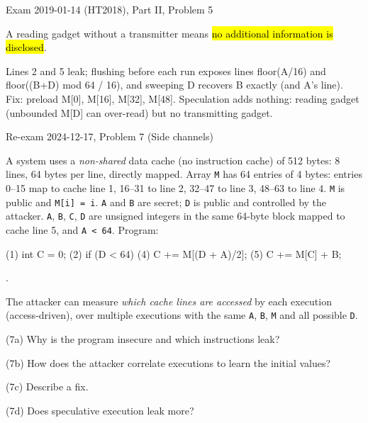 \documentclass[12pt, a4paper]{article}
\newcommand{\imp}[1]{\hl{#1}}                       %
\begin{document}
\begin{practicebox}{Exam 2019-01-14 (HT2018), Part II, Problem 5}
\begin{itemize}
    A reading gadget without a transmitter means \imp{no additional information is disclosed}.
\end{itemize}

\begin{answerbox}
Lines 2 and 5 leak; flushing before each run exposes lines floor(A/16) and floor((B+D) mod 64 / 16), and sweeping D recovers B exactly (and A's line). Fix: preload M[0], M[16], M[32], M[48]. Speculation adds nothing: reading gadget (unbounded M[D] can over-read) but no transmitting gadget.
\end{answerbox}
\end{practicebox}

\begin{practicebox}{Re-exam 2024-12-17, Problem 7 (Side channels)}
\begin{problembox}
A system uses a \emph{non-shared} data cache (no instruction cache) of 512 bytes: 8 lines, 64 bytes per line, directly mapped. Array \texttt{M} has 64 entries of 4 bytes: entries 0--15 map to cache line 1, 16--31 to line 2, 32--47 to line 3, 48--63 to line 4. \texttt{M} is public and \texttt{M[i] = i}. \texttt{A} and \texttt{B} are secret; \texttt{D} is public and controlled by the attacker. \texttt{A}, \texttt{B}, \texttt{C}, \texttt{D} are unsigned integers in the same 64-byte block mapped to cache line 5, and \texttt{A < 64}. Program:
\begin{codebox}
(1) int C = 0;
(2) if (D < 64) {
(4)     C += M[(D + A)/2];
(5)     C += M[C] + B;
}
\end{codebox}.

The attacker can measure \emph{which cache lines are accessed} by each execution (access-driven), over multiple executions with the same \texttt{A}, \texttt{B}, \texttt{M} and all possible \texttt{D}.

(7a) Why is the program insecure and which instructions leak?

(7b) How does the attacker correlate executions to learn the initial values?

(7c) Describe a fix.

(7d) Does speculative execution leak more?
\end{problembox}


\end{practicebox}
\end{document}

